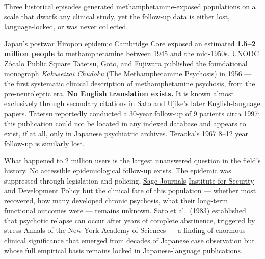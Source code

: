 Three historical episodes generated methamphetamine-exposed populations on a scale that dwarfs any clinical study, yet the follow-up data is either lost, language-locked, or was never collected.

Japan's postwar Hiropon epidemic \href{https://www.cambridge.org/core/journals/journal-of-asian-studies/article/abs/methamphetamine-solution-drugs-and-the-reconstruction-of-nation-in-postwar-japan/0A0FCE7E74AE7D1ECE9A134114773CE6}{Cambridge Core} exposed an estimated \textbf{1.5--2 million people} to methamphetamine between 1945 and the mid-1950s. \href{https://www.unodc.org/unodc/en/data-and-analysis/bulletin/bulletin_1989-01-01_1_page007.html}{UNODC} \href{https://www.zocalopublicsquare.org/the-world-war-ii-wonder-drug-that-never-left-japan/}{Zócalo Public Square} Tatetsu, Goto, and Fujiwara published the foundational monograph \emph{Kakuseizai Chūdoku} (The Methamphetamine Psychosis) in 1956 --- the first systematic clinical description of methamphetamine psychosis, from the pre-neuroleptic era. \textbf{No English translation exists.} It is known almost exclusively through secondary citations in Sato and Ujike's later English-language papers. Tatetsu reportedly conducted a 30-year follow-up of 9 patients circa 1997; this publication could not be located in any indexed database and appears to exist, if at all, only in Japanese psychiatric archives. Teraoka's 1967 8--12 year follow-up is similarly lost.

What happened to 2 million users is the largest unanswered question in the field's history. No accessible epidemiological follow-up exists. The epidemic was suppressed through legislation and policing, \href{https://journals.sagepub.com/doi/10.1177/009145090803500410}{Sage Journals} \href{https://www.isdp.eu/publication/forgotten-success-story-japan-methamphetamine-problem/}{Institute for Security and Development Policy} but the clinical fate of this population --- whether most recovered, how many developed chronic psychosis, what their long-term functional outcomes were --- remains unknown. Sato et al.~(1983) established that psychotic relapse can occur after years of complete abstinence, triggered by stress \href{https://nyaspubs.onlinelibrary.wiley.com/doi/10.1111/j.1749-6632.2000.tb05178.x}{Annals of the New York Academy of Sciences} --- a finding of enormous clinical significance that emerged from decades of Japanese case observation but whose full empirical basis remains locked in Japanese-language publications.

